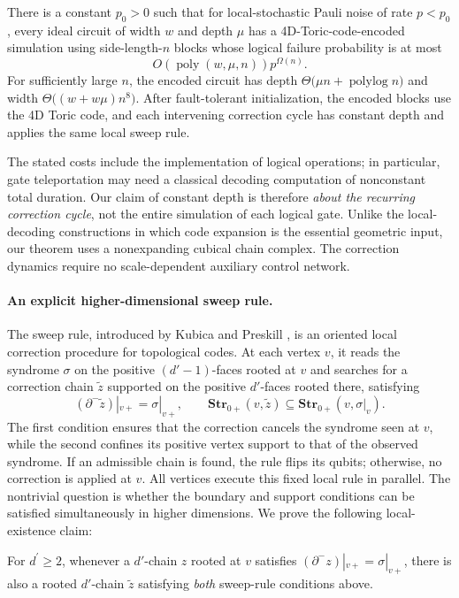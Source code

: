 \begin{theorem*}
There is a constant $p_0>0$ such that for local-stochastic Pauli noise of rate $p<p_0$, every ideal circuit of width $w$ and depth $\mu$ has a 4D-Toric-code-encoded simulation using side-length-$n$ blocks whose logical failure probability is at most
\begin{equation*}
  O\!\left(\operatorname{poly}(w,\mu,n)\right)p^{\Omega(n)}.
\end{equation*}
For sufficiently large $n$, the encoded circuit has depth $\Theta\!\bigl(\mu n+\operatorname{polylog}n\bigr)$ and width $\Theta\!\bigl((w+w\mu)n^8\bigr)$. After fault-tolerant initialization, the encoded blocks use the 4D Toric code, and each intervening correction cycle has constant depth and applies the same local sweep rule.
\end{theorem*}

The stated costs include the implementation of logical operations; in particular, gate teleportation may need a classical decoding computation of nonconstant total duration. Our claim of constant depth is therefore \emph{about the recurring correction cycle}, not the entire simulation of each logical gate. Unlike the local-decoding constructions in which code expansion is the essential geometric input, our theorem uses a nonexpanding cubical chain complex. The correction dynamics require no scale-dependent auxiliary control network.

\paragraph{An explicit higher-dimensional sweep rule.}
The sweep rule, introduced by Kubica and Preskill \cite{Kubica_2019}, is an oriented local correction procedure for topological codes. At each vertex $v$, it reads the syndrome $\sigma$ on the positive $(d'-1)$-faces rooted at $v$ and searches for a correction chain $\tilde z$ supported on the positive $d'$-faces rooted there, satisfying
\begin{equation*}
  (\partial^-\tilde z)|_{v+}=\sigma|_{v+},
  \qquad
  \mathbf{Str}_{0+}(v,\tilde z)\subseteq\mathbf{Str}_{0+}(v,\sigma|_{v}).
\end{equation*}
The first condition ensures that the correction cancels the syndrome seen at $v$, while the second confines its positive vertex support to that of the observed syndrome. If an admissible chain is found, the rule flips its qubits; otherwise, no correction is applied at $v$. All vertices execute this fixed local rule in parallel.
The nontrivial question is whether the boundary and support conditions can be satisfied simultaneously in higher dimensions. We prove the following local-existence claim:
\begin{claim*}
  For $d^{\prime}\ge 2$, whenever a $d'$-chain $z$ rooted at $v$ satisfies $(\partial^- z)|_{v+}=\sigma|_{v+}$, there is also a rooted $d'$-chain $\tilde z$ satisfying \emph{both} sweep-rule conditions above. 
\end{claim*}

